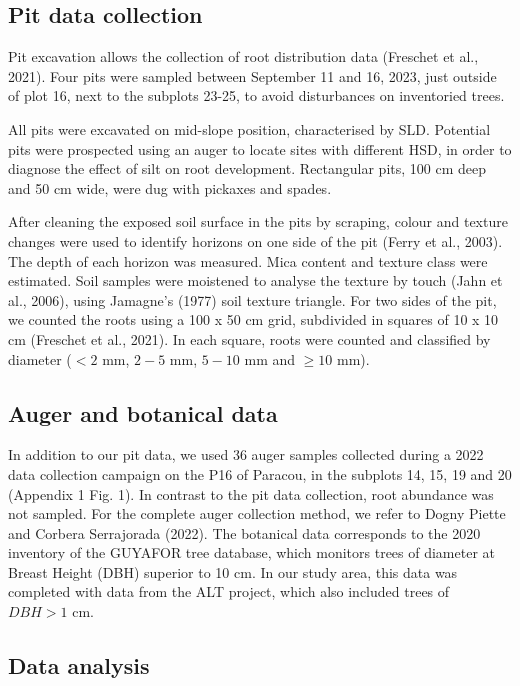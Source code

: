 \documentclass[fleqn,12pt]{latex/stylish_article} %
\begin{document}
\hypertarget{pit-data-collection}{%
\subsection{Pit data collection}\label{pit-data-collection}}

Pit excavation allows the collection of root distribution data (Freschet et al., 2021). Four pits were sampled between September 11 and 16, 2023, just outside of plot 16, next to the subplots 23-25, to avoid disturbances on inventoried trees.

All pits were excavated on mid-slope position, characterised by SLD. Potential pits were prospected using an auger to locate sites with different HSD, in order to diagnose the effect of silt on root development. Rectangular pits, 100 cm deep and 50 cm wide, were dug with pickaxes and spades.

After cleaning the exposed soil surface in the pits by scraping, colour and texture changes were used to identify horizons on one side of the pit (Ferry et al., 2003). The depth of each horizon was measured. Mica content and texture class were estimated. Soil samples were moistened to analyse the texture by touch (Jahn et al., 2006), using Jamagne's (1977) soil texture triangle. For two sides of the pit, we counted the roots using a 100 x 50 cm grid, subdivided in squares of 10 x 10 cm (Freschet et al., 2021). In each square, roots were counted and classified by diameter (\(< 2\) mm, \(2-5\) mm, \(5-10\) mm and \(≥ 10\) mm).

\hypertarget{auger-and-botanical-data}{%
\subsection{Auger and botanical data}\label{auger-and-botanical-data}}

In addition to our pit data, we used 36 auger samples collected during a 2022 data collection campaign on the P16 of Paracou, in the subplots 14, 15, 19 and 20 (Appendix 1 Fig. 1). In contrast to the pit data collection, root abundance was not sampled. For the complete auger collection method, we refer to Dogny Piette and Corbera Serrajorada (2022).
The botanical data corresponds to the 2020 inventory of the GUYAFOR tree database, which monitors trees of diameter at Breast Height (DBH) superior to 10 cm. In our study area, this data was completed with data from the ALT project, which also included trees of \(DBH > 1\) cm.

\hypertarget{data-analysis}{%
\subsection{Data analysis}\label{data-analysis}}
\end{document}
